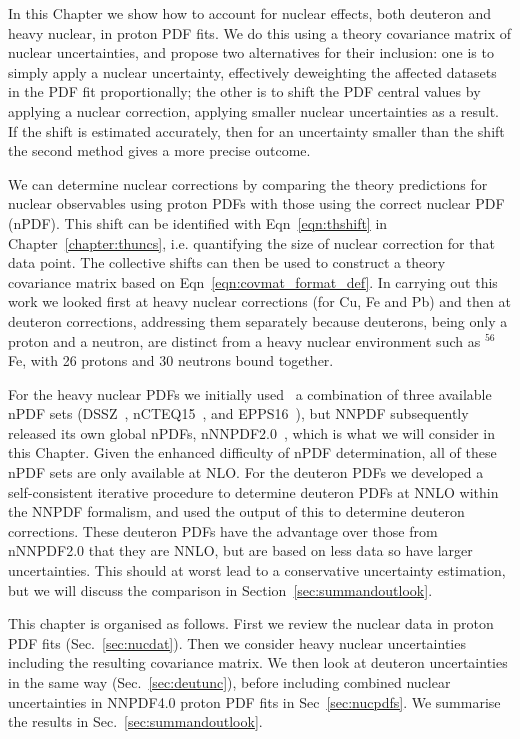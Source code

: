 In this Chapter we show how to account for nuclear effects, both deuteron and heavy nuclear, in proton PDF fits. We do this using a theory covariance matrix of nuclear uncertainties, and propose two alternatives for their inclusion: one is to simply apply a nuclear uncertainty, effectively deweighting the affected datasets in the PDF fit proportionally; the other is to shift the PDF central values by applying a nuclear correction, applying smaller nuclear uncertainties as a result. If the shift is estimated accurately, then for an uncertainty smaller than the shift the second method gives a more precise outcome.

We can determine nuclear corrections by comparing the theory predictions for nuclear observables using proton PDFs with those using the correct nuclear PDF (nPDF). This shift can be identified with Eqn~\ref{eqn:thshift} in Chapter~\ref{chapter:thuncs}, i.e. quantifying the size of nuclear correction for that data point. The collective shifts can then be used to construct a theory covariance matrix based on Eqn~\ref{eqn:covmat_format_def}. In carrying out this work we looked first at heavy nuclear corrections (for Cu, Fe and Pb) and then at deuteron corrections, addressing them separately because deuterons, being only a proton and a neutron, are distinct from a heavy nuclear environment such as $^{56}$Fe, with 26 protons and 30 neutrons bound together. 

For the heavy nuclear PDFs we initially used~\cite{Ball:2018twp} a combination of three available nPDF sets (DSSZ~\cite{deFlorian:2011fp},
nCTEQ15~\cite{Kovarik:2015cma}, and EPPS16~\cite{Eskola:2016oht}), but NNPDF subsequently released its own global nPDFs, nNNPDF2.0~\cite{AbdulKhalek:2020yuc}, which is what we will consider in this Chapter. Given the enhanced difficulty of nPDF determination, all of these nPDF sets are only available at NLO. For the deuteron PDFs we developed a self-consistent iterative procedure to determine deuteron PDFs at NNLO within the NNPDF formalism, and used the output of this to determine deuteron corrections. These deuteron PDFs have the advantage over those from nNNPDF2.0 that they are NNLO, but are based on less data so have larger uncertainties. This should at worst lead to a conservative uncertainty estimation, but we will discuss the comparison in Section~\ref{sec:summandoutlook}.

This chapter is organised as follows. First we review the nuclear data in proton PDF fits (Sec.~\ref{sec:nucdat}). Then we consider heavy nuclear uncertainties including the resulting covariance matrix. We then look at deuteron uncertainties in the same way (Sec.~\ref{sec:deutunc}), before  including combined nuclear uncertainties in NNPDF4.0 proton PDF fits in Sec~\ref{sec:nucpdfs}. We summarise the results in Sec.~\ref{sec:summandoutlook}.

